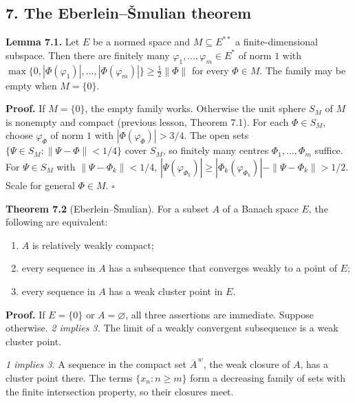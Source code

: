 \documentclass[
  english,
  11pt,
  a4paper,
]{article}
\newcounter{none} %
\providecommand{\tightlist}{%
  \setlength{\itemsep}{0pt}\setlength{\parskip}{0pt}}
\begin{document}
\subsection[7. The Eberlein--Šmulian
theorem]{\texorpdfstring{\protect\hypertarget{weak-topologies-tychonoff-banach-alaoglu-mazur-bipolars-krein-milman-and-eberlein-smulian--oa-fnd-wt-07}{}{}7.
The Eberlein--Šmulian
theorem}{7. The Eberlein--Šmulian theorem}}\label{weak-topologies-tychonoff-banach-alaoglu-mazur-bipolars-krein-milman-and-eberlein-smulian--OA-FND-WT-07}

\textbf{Lemma 7.1.} Let \(E\) be a normed space and
\(M\subseteq E^{**}\) a finite-dimensional subspace. Then there are
finitely many \(\varphi_1,\dots,\varphi_m\in E^*\) of norm \(1\) with
\(\max\{0,|\Phi(\varphi_1)|,\dots,|\Phi(\varphi_m)|\}\ge\frac12\|\Phi\|\)
for every \(\Phi\in M\). The family may be empty when \(M=\{0\}\).

\textbf{Proof.} If \(M=\{0\}\), the empty family works. Otherwise the
unit sphere \(S_M\) of \(M\) is nonempty and compact (previous lesson,
Theorem 7.1). For each \(\Phi\in S_M\), choose \(\varphi_\Phi\) of norm
\(1\) with \(|\Phi(\varphi_\Phi)|>3/4\). The open sets
\(\{\Psi\in S_M:\|\Psi-\Phi\|<1/4\}\) cover \(S_M\), so finitely many
centres \(\Phi_1,\dots,\Phi_m\) suffice. For \(\Psi\in S_M\) with
\(\|\Psi-\Phi_k\|<1/4\),
\(|\Psi(\varphi_{\Phi_k})|\ge|\Phi_k(\varphi_{\Phi_k})|-\|\Psi-\Phi_k\|>1/2\).
Scale for general \(\Phi\in M\). \(\square\)

\textbf{Theorem 7.2} (Eberlein--Šmulian). For a subset \(A\) of a Banach
space \(E\), the following are equivalent:

\begin{enumerate}
\tightlist
\item
  \(A\) is relatively weakly compact;
\item
  every sequence in \(A\) has a subsequence that converges weakly to a
  point of \(E\);
\item
  every sequence in \(A\) has a weak cluster point in \(E\).
\end{enumerate}

\textbf{Proof.} If \(E=\{0\}\) or \(A=\varnothing\), all three
assertions are immediate. Suppose otherwise. \emph{2 implies 3.} The
limit of a weakly convergent subsequence is a weak cluster point.

\emph{1 implies 3.} A sequence in the compact set \(\overline A^{\,w}\),
the weak closure of \(A\), has a cluster point there. The terms
\(\{x_n:n\ge m\}\) form a decreasing family of sets with the finite
intersection property, so their closures meet.
\end{document}
